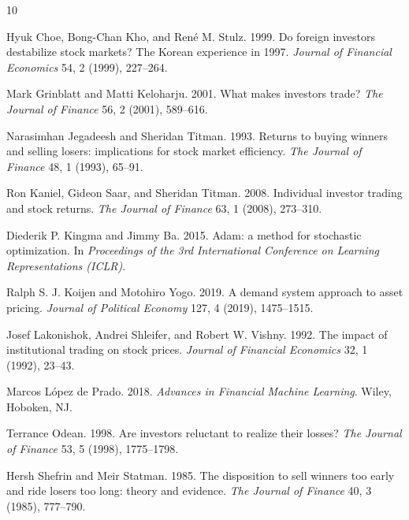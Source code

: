 \documentclass[sigconf,anonymous,review]{acmart}
\begin{document}
\begin{thebibliography}{10}

Hyuk Choe, Bong-Chan Kho, and Ren\'e M. Stulz. 1999.
\newblock Do foreign investors destabilize stock markets? The Korean
  experience in 1997.
\newblock \emph{Journal of Financial Economics} 54, 2 (1999), 227--264.

Mark Grinblatt and Matti Keloharju. 2001.
\newblock What makes investors trade?
\newblock \emph{The Journal of Finance} 56, 2 (2001), 589--616.

Narasimhan Jegadeesh and Sheridan Titman. 1993.
\newblock Returns to buying winners and selling losers: implications for
  stock market efficiency.
\newblock \emph{The Journal of Finance} 48, 1 (1993), 65--91.

Ron Kaniel, Gideon Saar, and Sheridan Titman. 2008.
\newblock Individual investor trading and stock returns.
\newblock \emph{The Journal of Finance} 63, 1 (2008), 273--310.

Diederik P. Kingma and Jimmy Ba. 2015.
\newblock Adam: a method for stochastic optimization.
\newblock In \emph{Proceedings of the 3rd International Conference on
  Learning Representations (ICLR)}.

Ralph S. J. Koijen and Motohiro Yogo. 2019.
\newblock A demand system approach to asset pricing.
\newblock \emph{Journal of Political Economy} 127, 4 (2019), 1475--1515.

Josef Lakonishok, Andrei Shleifer, and Robert W. Vishny. 1992.
\newblock The impact of institutional trading on stock prices.
\newblock \emph{Journal of Financial Economics} 32, 1 (1992), 23--43.

Marcos L\'opez de Prado. 2018.
\newblock \emph{Advances in Financial Machine Learning}.
\newblock Wiley, Hoboken, NJ.

Terrance Odean. 1998.
\newblock Are investors reluctant to realize their losses?
\newblock \emph{The Journal of Finance} 53, 5 (1998), 1775--1798.

Hersh Shefrin and Meir Statman. 1985.
\newblock The disposition to sell winners too early and ride losers too
  long: theory and evidence.
\newblock \emph{The Journal of Finance} 40, 3 (1985), 777--790.


\end{thebibliography}
\end{document}
